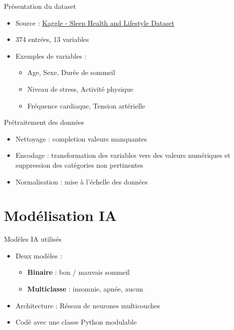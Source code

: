 \documentclass{beamer}
\begin{document}
\begin{frame}{Présentation du dataset}
  \begin{itemize}
    \item Source : \href{https://www.kaggle.com/datasets/uom190346a/sleep-health-and-lifestyle-dataset}{Kaggle - Sleep Health and Lifestyle Dataset}
    \item 374 entrées, 13 variables
    \item Exemples de variables :
    \begin{itemize}
      \item Age, Sexe, Durée de sommeil
      \item Niveau de stress, Activité physique
      \item Fréquence cardiaque, Tension artérielle
    \end{itemize}
  \end{itemize}
\end{frame}

\begin{frame}{Prétraitement des données}
  \begin{itemize}
    \item Nettoyage : completion valeurs manquantes
    \item Encodage : transformation des variables vers des valeurs numériques et suppression des catégories non pertinentes
    \item Normalisation : mise à l'échelle des données
  \end{itemize}
\end{frame}

\section{Modélisation IA}

\begin{frame}{Modèles IA utilisés}
  \begin{itemize}
    \item Deux modèles :
    \begin{itemize}
      \item \textbf{Binaire} : bon / mauvais sommeil
      \item \textbf{Multiclasse} : insomnie, apnée, aucun
    \end{itemize}
    \item Architecture : Réseau de neurones multicouches
    \item Codé avec une classe Python modulable
  \end{itemize}
\end{frame}
\end{document}
